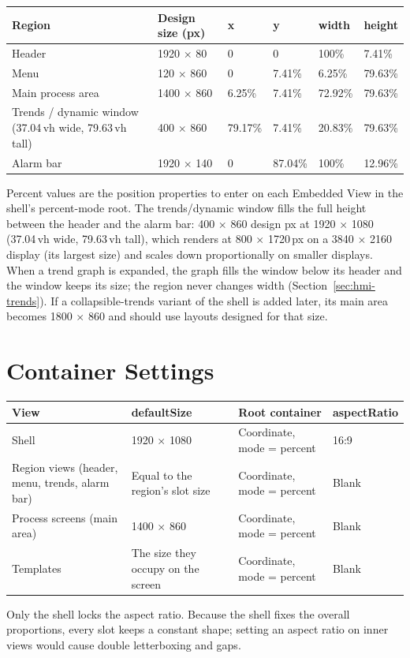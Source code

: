 \begin{center}
\begin{tabular}{@{}P{3.93cm}P{2.72cm}P{1.96cm}P{1.96cm}P{2.72cm}P{2.37cm}@{}}
\toprule
{}\textbf{Region} & \textbf{Design size (px)} & \textbf{x} & \textbf{y} & \textbf{width} & \textbf{height} \\
\midrule
Header & 1920 $\times$ 80 & 0 & 0 & 100\% & 7.41\% \\
Menu & 120 $\times$ 860 & 0 & 7.41\% & 6.25\% & 79.63\% \\
Main process area & 1400 $\times$ 860 & 6.25\% & 7.41\% & 72.92\% & 79.63\% \\
Trends / dynamic window (37.04\,vh wide, 79.63\,vh tall) & 400 $\times$ 860 & 79.17\% & 7.41\% & 20.83\% & 79.63\% \\
Alarm bar & 1920 $\times$ 140 & 0 & 87.04\% & 100\% & 12.96\% \\
\bottomrule
\end{tabular}
\end{center}
Percent values are the position properties to enter on each Embedded View in the shell's percent-mode root. The trends/dynamic window fills the full height between the header and the alarm bar: 400 $\times$ 860 design px at 1920 $\times$ 1080 (37.04\,vh wide, 79.63\,vh tall), which renders at 800 $\times$ 1720\,px on a 3840 $\times$ 2160 display (its largest size) and scales down proportionally on smaller displays. When a trend graph is expanded, the graph fills the window below its header and the window keeps its size; the region never changes width (Section~\ref{sec:hmi-trends}). If a collapsible-trends variant of the shell is added later, its main area becomes 1800 $\times$ 860 and should use layouts designed for that size.

\section{Container Settings}
\begin{center}
\begin{tabular}{@{}P{4.98cm}P{4.16cm}P{4.77cm}P{2.60cm}@{}}
\toprule
{}\textbf{View} & \textbf{defaultSize} & \textbf{Root container} & \textbf{aspectRatio} \\
\midrule
Shell & 1920 $\times$ 1080 & Coordinate, mode = percent & 16:9 \\
Region views (header, menu, trends, alarm bar) & Equal to the region's slot size & Coordinate, mode = percent & Blank \\
Process screens (main area) & 1400 $\times$ 860 & Coordinate, mode = percent & Blank \\
Templates & The size they occupy on the screen & Coordinate, mode = percent & Blank \\
\bottomrule
\end{tabular}
\end{center}
Only the shell locks the aspect ratio. Because the shell fixes the overall proportions, every slot keeps a constant shape; setting an aspect ratio on inner views would cause double letterboxing and gaps.

